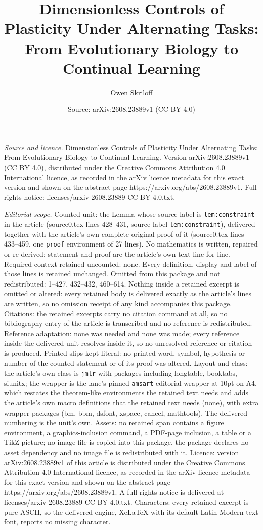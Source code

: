 \documentclass[10pt,a4paper]{amsart}
\title[Dimensionless Controls of Plasticity Under Alternating Tasks]{Dimensionless Controls of Plasticity Under Alternating Tasks: From Evolutionary Biology to Continual Learning}
\author{Owen Skriloff}
\date{Source: arXiv:2608.23889v1 (CC BY 4.0)}
\begin{document}
\maketitle

\noindent\emph{Source and licence.} Dimensionless Controls of Plasticity Under Alternating Tasks: From Evolutionary Biology to Continual Learning. Version arXiv:2608.23889v1 (CC BY 4.0), distributed under the Creative Commons Attribution 4.0 International licence, as recorded in the arXiv licence metadata for this exact version and shown on the abstract page https://arxiv.org/abs/2608.23889v1. Full rights notice: licenses/arxiv-2608.23889-CC-BY-4.0.txt.\par\smallskip

\noindent\textit{Editorial scope.} Counted unit: the Lemma whose source label is \texttt{lem:constraint} in the article (source0.tex lines 428--431, source label \texttt{lem:constraint}), delivered together with the article's own complete original proof of it (source0.tex lines 433--459, one \texttt{proof} environment of 27 lines). No mathematics is written, repaired or re-derived: statement and proof are the article's own text line for line. Required context retained uncounted: none. Every definition, display and label of those lines is retained unchanged. Omitted from this package and not redistributed: 1--427, 432--432, 460--614. Nothing inside a retained excerpt is omitted or altered: every retained body is delivered exactly as the article's lines are written, so no omission receipt of any kind accompanies this package. Citations: the retained excerpts carry no citation command at all, so no bibliography entry of the article is transcribed and no reference is redistributed. Reference adaptation: none was needed and none was made; every reference inside the delivered unit resolves inside it, so no unresolved reference or citation is produced. Printed slips kept literal: no printed word, symbol, hypothesis or number of the counted statement or of its proof was altered. Layout and class: the article's own class is \texttt{jmlr} with packages including longtable, booktabs, siunitx; the wrapper is the lane's pinned \texttt{amsart} editorial wrapper at 10pt on A4, which restates the theorem-like environments the retained text needs and adds the article's own macro definitions that the retained text needs (none), with extra wrapper packages (bm, bbm, dsfont, xspace, cancel, mathtools). The delivered numbering is the unit's own. Assets: no retained span contains a figure environment, a graphics-inclusion command, a PDF-page inclusion, a table or a TikZ picture; no image file is copied into this package, the package declares no asset dependency and no image file is redistributed with it. Licence: version arXiv:2608.23889v1 of this article is distributed under the Creative Commons Attribution 4.0 International licence, as recorded in the arXiv licence metadata for this exact version and shown on the abstract page https://arxiv.org/abs/2608.23889v1. A full rights notice is delivered at licenses/arxiv-2608.23889-CC-BY-4.0.txt. Characters: every retained excerpt is pure ASCII, so the delivered engine, XeLaTeX with its default Latin Modern text font, reports no missing character.
\end{document}
